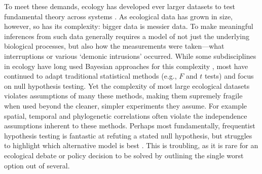 \documentclass[11pt]{article}
\begin{document}
{To meet these demands, ecology has developed ever larger datasets to test fundamental theory across systems \citep{Hampton2013}. As ecological data has grown in size, however, so has its complexity: bigger data is messier data. To make meaningful inferences from such data generally requires a model of not just the underlying biological processes, but also how the measurements were taken---what interruptions or various `demonic intrusions' \citep{Hurlbert:1984br} occurred. While some subdisciplines in ecology have long used Bayesian approaches for this complexity  \citep[generally in fields focused on inferring population sizes of things people want to eat or manage,][]{muthuku2008,zheng2007,trijoulet2018,strinella2020potential}, most have continued to adapt traditional statistical methods (e.g., $F$ and $t$ tests) and focus on null hypothesis testing. Yet the complexity of most large ecological datasets violates assumptions of many these methods, making them supremely fragile when used beyond the cleaner, simpler experiments they assume. For example spatial, temporal and phylogenetic correlations often violate the independence assumptions inherent to these methods.
Perhaps most fundamentally, frequentist hypothesis testing is fantastic at refuting a stated null hypothesis, but struggles to highlight which alternative model is best \citep[but see information-theoretic criteria;][]{Burnham2004}. This is troubling, as it is rare for an ecological debate or policy decision to be solved by outlining the single worst option out of several.

}
\end{document}
